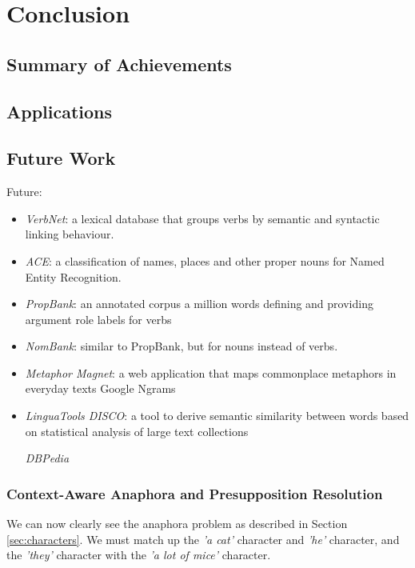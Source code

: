 \def\baselinestretch{1}
\chapter{Conclusion}
\ifpdf
    \graphicspath{{Conclusions/ConclusionsFigs/PNG/}{Conclusions/ConclusionsFigs/PDF/}{Conclusions/ConclusionsFigs/}}
\else
    \graphicspath{{Conclusions/ConclusionsFigs/EPS/}{Conclusions/ConclusionsFigs/}}
\fi

\def\baselinestretch{1.66}


\section{Summary of Achievements}

\section{Applications}

\section{Future Work}



Future:
\begin{itemize}
\item{\textit{VerbNet}: a lexical database that groups verbs by semantic and syntactic linking behaviour.\cite{schuler2005verbnet}}
\item{\textit{ACE}: a classification of names, places and other proper nouns for Named Entity Recognition.\cite{doddington2004automatic}}
\item{\textit{PropBank}: an annotated corpus a million words defining and providing argument role labels for verbs\cite{kingsbury2002treebank}}
\item{\textit{NomBank}: similar to PropBank, but for nouns instead of verbs.\cite{meyers2004nombank}}
\item{\textit{Metaphor Magnet}: a web application that maps commonplace metaphors in everyday texts\cite{vealespecifying}}
Google Ngrams
\item{\textit{LinguaTools DISCO}: a tool to derive semantic similarity between words based on statistical analysis of large text collections\cite{kolb2008disco}}

\textit{DBPedia}
\end{itemize}

\subsection{Context-Aware Anaphora and Presupposition Resolution}
\label{sec:ca-ar}
We can now clearly see the anaphora problem as described in Section \ref{sec:characters}. We must match up the \textit{'a cat'} character and \textit{'he'} character, and the \textit{'they'} character with the \textit{'a lot of mice'} character. 

